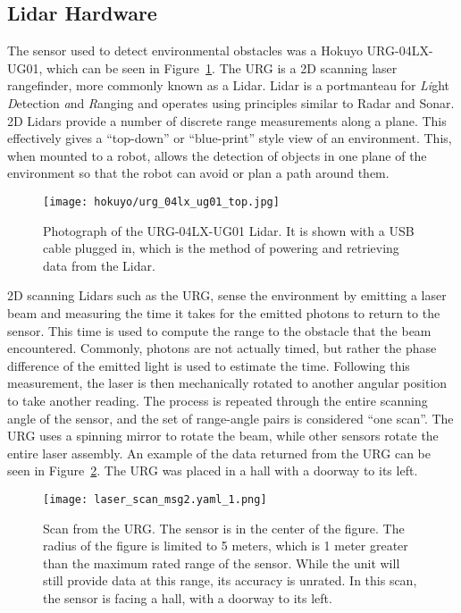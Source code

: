 \subsection{Lidar Hardware}
The sensor used to detect environmental obstacles was a Hokuyo
URG-04LX-UG01, which can be seen in Figure~\ref{fig:lidar_top1}. 
The URG is a 2D scanning laser rangefinder, more commonly known as
a Lidar. Lidar is a portmanteau for \textit{Li}ght \textit{D}etection 
\textit{a}nd \textit{R}anging and operates using principles similar 
to Radar and Sonar. 2D Lidars provide a number of discrete range measurements
along a plane. This effectively gives a ``top-down'' or ``blue-print''
style view of an environment.
This, when mounted to a robot, allows the detection of objects in one plane of
the environment so that the robot can avoid or plan a path around them.

\begin{figure}
\centering
\texttt{[image: hokuyo/urg\_04lx\_ug01\_top.jpg]}
\caption{Photograph of the URG-04LX-UG01 Lidar. It is shown
         with a USB cable plugged in, which is the method of powering
         and retrieving data from the Lidar.}
\label{fig:lidar_top1}
\end{figure}

2D scanning Lidars such as the URG, sense the environment by emitting a laser
beam and measuring the time it takes for the emitted photons to return to the sensor.
This time is used to compute the range to the obstacle that the beam encountered.
Commonly, photons are not actually timed, but rather the phase difference of the
emitted light is used to estimate the time.
Following this measurement, the laser is then mechanically rotated to another 
angular position to take another reading. The process is repeated through the 
entire scanning angle of the sensor, and the set of range-angle pairs is 
considered ``one scan''. The URG uses a spinning mirror to rotate the beam, while
other sensors rotate the entire laser assembly.
An example of the data returned from the URG can be seen in Figure~\ref{fig:lidar_scan1}.
The URG was placed in a hall with a doorway to its left.

\begin{figure}
\centering
\texttt{[image: laser\_scan\_msg2.yaml\_1.png]}
\caption{Scan from the URG\@.
         The sensor is in the center of the figure.
         The radius of the figure is limited to 5 meters, which is 1 meter 
         greater than the maximum rated range of the sensor. While the unit will
         still provide data at this range, its accuracy is unrated.
         In this scan, the sensor is facing a hall, with a doorway to its left.}
\label{fig:lidar_scan1}
\end{figure}

